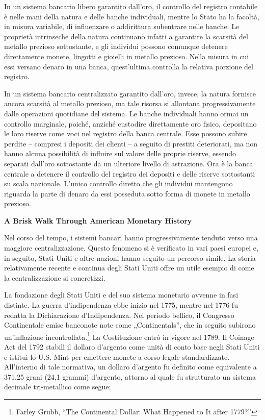 \documentclass[
  a5paper,
  smalldemyvopaper,10pt,twoside,onecolumn,openright,extrafontsizes,hidelinks]{memoir}
\begin{document}
In un sistema bancario libero garantito dall'oro, il controllo del
registro contabile è nelle mani della natura e delle banche individuali,
mentre lo Stato ha la facoltà, in misura variabile, di influenzare o
addirittura subentrare nelle banche. Le proprietà intrinseche della
natura continuano infatti a garantire la scarsità del metallo prezioso
sottostante, e gli individui possono comunque detenere direttamente
monete, lingotti e gioielli in metallo prezioso. Nella misura in cui
essi versano denaro in una banca, quest'ultima controlla la relativa
porzione del registro.

In un sistema bancario centralizzato garantito dall'oro, invece, la
natura fornisce ancora scarsità al metallo prezioso, ma tale risorsa si
allontana progressivamente dalle operazioni quotidiane del sistema. Le
banche individuali hanno ormai un controllo marginale, poiché, anziché
custodire direttamente oro fisico, depositano le loro riserve come voci
nel registro della banca centrale. Esse possono subire perdite --
compresi i depositi dei clienti -- a seguito di prestiti deteriorati, ma
non hanno alcuna possibilità di influire sul valore delle proprie
riserve, essendo separati dall'oro sottostante da un ulteriore livello
di astrazione. Ora è la banca centrale a detenere il controllo del
registro dei depositi e delle riserve sottostanti su scala nazionale.
L'unico controllo diretto che gli individui mantengono riguarda la parte
di denaro da essi posseduta sotto forma di monete in metallo prezioso.

\textbf{A Brisk Walk Through American Monetary History}

Nel corso del tempo, i sistemi bancari hanno progressivamente tenduto
verso una maggiore centralizzazione. Questo fenomeno si è verificato in
vari paesi europei e, in seguito, Stati Uniti e altre nazioni hanno
seguito un percorso simile. La storia relativamente recente e continua
degli Stati Uniti offre un utile esempio di come la centralizzazione si
concretizzi.

La fondazione degli Stati Uniti e del suo sistema monetario avvenne in
fasi distinte. La guerra d'indipendenza ebbe inizio nel 1775, mentre nel
1776 fu redatta la Dichiarazione d'Indipendenza. Nel periodo bellico, il
Congresso Continentale emise banconote note come „Continentals'', che in
seguito subirono un'inflazione incontrollata.\footnote{Farley Grubb,
  ``The Continental Dollar: What Happened to It after 1779?''} La
Costituzione entrò in vigore nel 1789. Il Coinage Act del 1792 stabilì
il dollaro d'argento come unità di conto base negli Stati Uniti e
istituì lo U.S. Mint per emettere monete a corso legale standardizzate.
All'interno di tale normativa, un dollaro d'argento fu definito come
equivalente a 371,25 grani (24,1 grammi) d'argento, attorno al quale fu
strutturato un sistema decimale tri-metallico come segue:
\end{document}
